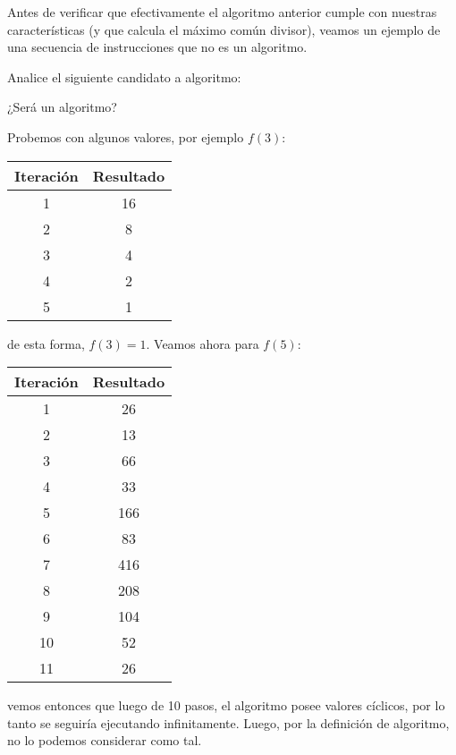 Antes de verificar que efectivamente el algoritmo anterior cumple con nuestras características (y que calcula el máximo común divisor), veamos un ejemplo de una secuencia de instrucciones que no es un algoritmo.

\begin{ejem}
    Analice el siguiente candidato a algoritmo:
    
    \begin{algoritmo}
        \caption{¿Será un algoritmo?}\label{alg:f}
        
        
    \end{algoritmo}
    
    Probemos con algunos valores, por ejemplo $f(3)$:
    
    \begin{center}
        \begin{tabular}{c|c}
            Iteración & Resultado \\ \toprule
            1 & 16 \\
            2 & 8  \\
            3 & 4  \\
            4 & 2  \\
            5 & 1 
        \end{tabular}
    \end{center}
    
    \noindent de esta forma, $f(3) = 1$. Veamos ahora para $f(5)$:
    
    \begin{center}
        \begin{tabular}{c|c}
            Iteración & Resultado \\ \toprule
            1  & 26  \\
            2  & 13  \\
            3  & 66  \\
            4  & 33  \\
            5  & 166 \\
            6  & 83  \\
            7  & 416 \\
            8  & 208 \\
            9  & 104 \\
            10 & 52  \\
            11 & 26
        \end{tabular}
    \end{center}
    
    \noindent vemos entonces que luego de 10 pasos, el algoritmo posee valores cíclicos, por lo tanto se seguiría ejecutando infinitamente. Luego, por la definición de algoritmo, no lo podemos considerar como tal.
\end{ejem}

